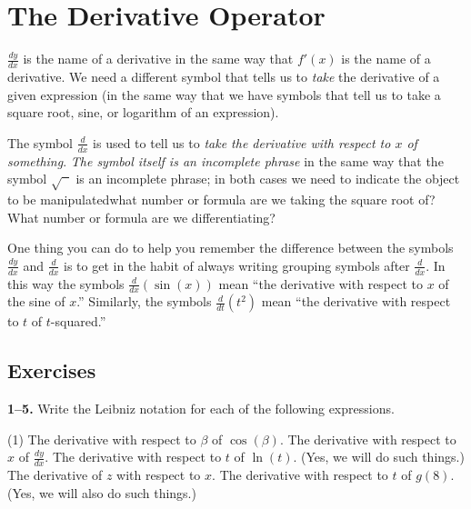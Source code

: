 \documentclass[10pt,oneside,]{book}
\theoremstyle{plain}
\theoremstyle{definition}
\numberwithin{equation}{section}
\newcommand{\fe}[2]{#1\mathopen{}\left(#2\right)\mathclose{}}
\newcommand{\fd}[1]{#1'}
\newcommand{\lz}[2]{\frac{d#1}{d#2}}
\newcommand{\lzo}[1]{\frac{d}{d#1}}
\newcommand{\lzoo}[2]{{\frac{d}{d#1}}{\left(#2\right)}}
\begin{document}
\section[The Derivative Operator]{The Derivative Operator}\label{section-derivative-operator}
\(\lz{y}{x}\) is the name of a derivative in the same way that \(\fe{\fd{f}}{x}\) is the name of a derivative.  We need a different symbol that tells us to \emph{take} the derivative of a given expression (in the same way that we have symbols that tell us to take a square root, sine, or  logarithm of an expression).%
\par
The symbol \(\lzo{x}\) is used to tell us to \emph{take the derivative with respect to \(x\) of something}. \emph{The symbol itself is an incomplete phrase} in the same way that the symbol \(\sqrt{\phantom{x}}\) is an incomplete phrase; in both cases we need to indicate the object to be manipulated\textemdash{}what number or formula are we taking the square root of? What number or formula  are we differentiating?%
\par
One thing you can do to help you remember the difference between the symbols \(\lz{y}{x}\) and \(\lzo{x}\) is to get in the habit of always writing grouping symbols after \(\lzo{x}\).  In this way the symbols \(\lzoo{x}{\fe{\sin}{x}}\) mean ``the derivative with respect to \(x\) of the sine of \(x\).''  Similarly, the symbols \(\lzoo{t}{t^2}\) mean ``the derivative with respect to \(t\) of \(t\)-squared.''%
\typeout{************************************************}
\typeout{************************************************}
\subsection[Exercises]{Exercises}\label{exercises-32}
\textbf{1--5. }\hypertarget{exercisegroup-71}{\null}Write the Leibniz notation for each of the following expressions.%
\par
\begin{exercisegroup}(1)
\exercise[1.]\hypertarget{exercise-349}{\null}The derivative with respect to \(\beta\) of \(\fe{\cos}{\beta}\).%
\exercise[2.]\hypertarget{exercise-350}{\null}The derivative with respect to \(x\) of \(\lz{y}{x}\).%
\exercise[3.]\hypertarget{exercise-351}{\null}The derivative with respect to \(t\) of \(\fe{\ln}{t}\).  (Yes, we will do such things.)%
\exercise[4.]\hypertarget{exercise-352}{\null}The derivative of \(z\) with respect to \(x\).%
\exercise[5.]\hypertarget{exercise-353}{\null}The derivative with respect to \(t\) of \(\fe{g}{8}\).  (Yes, we will also do such things.)%
\end{exercisegroup}
\par\smallskip\noindent
\typeout{************************************************}
\typeout{************************************************}
\end{document}
